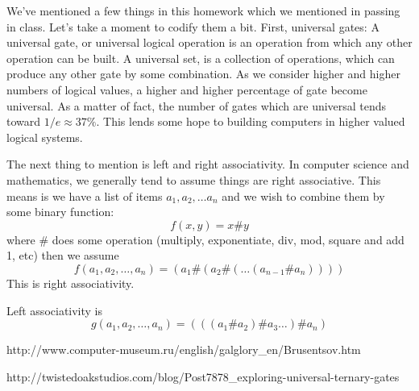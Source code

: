 \documentclass[16 pt]{amsart}
\theoremstyle{definition}
\theoremstyle{remark}
\numberwithin{equation}{subsection}
\begin{document}
We've mentioned a few things in this homework which we mentioned in passing in class.  Let's take a moment to codify them a bit.  First, universal gates:  A universal gate, or universal logical operation is an operation from which any other operation can be built.  A universal set, is a collection of operations, which can produce any other gate by some combination.  As we consider higher and higher numbers of logical values, a higher and higher percentage of gate become universal.  As a matter of fact, the number of gates which are universal tends toward $1/e \approx 37\%$.  This lends some hope to building computers in higher valued logical systems.\\

\par The next thing to mention is left and right associativity.  In computer science and mathematics, we generally tend to assume things are right associative.  This means is we have a list of items $a_1,a_2,\dots a_n$ and we wish to combine them by some binary function:
\[
f(x,y) = x \# y
\]
where $\#$ does some operation (multiply, exponentiate, div, mod, square and add 1, etc)
then we assume
\[
f(a_1,a_2,\dots, a_n) = (a_1 \# (a_2 \#(\dots(a_{n-1}\# a_n))))
\]
This is right associativity.

Left associativity is 
\[
g(a_1,a_2,\dots,a_n) = (((a_1\# a_2)\# a_3 \dots )\# a_n)
\]




\begin{thebibliography}{99}
 http://www.computer-museum.ru/english/galglory\_en/Brusentsov.htm

 http://twistedoakstudios.com/blog/Post7878\_exploring-universal-ternary-gates

\end{thebibliography}
\end{document}
